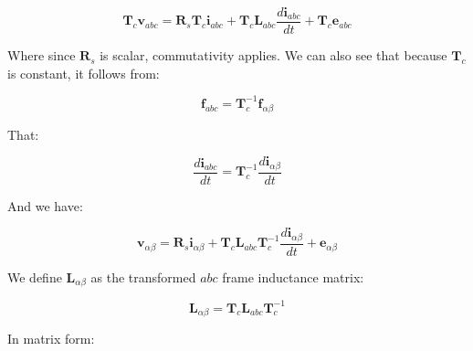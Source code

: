 \documentclass{article}
\begin{document}
\begin{equation}
    \mathbf{T}_c\mathbf{v}_{abc} = \mathbf{R}_s\mathbf{T}_c\mathbf{i}_{abc} + \mathbf{T}_c\mathbf{L}_{abc}\frac{d\mathbf{i}_{abc}}{dt} + \mathbf{T}_c\boldsymbol{e}_{abc}
\end{equation}

Where since $\mathbf{R}_s$ is scalar, commutativity applies. We can also see that because $\mathbf{T}_c$ is constant, it follows from:

\begin{equation}
    \mathbf{f}_{abc} = \mathbf{T}_c^{-1}\mathbf{f}_{\alpha\beta}
\end{equation}

That:

\begin{equation}
    \frac{d\mathbf{i}_{abc}}{dt} = \mathbf{T}_c^{-1}\frac{d\mathbf{i}_{\alpha\beta}}{dt}
\end{equation}

And we have:

\begin{equation}
    \mathbf{v}_{\alpha\beta} = \mathbf{R}_s\mathbf{i}_{\alpha\beta} + \mathbf{T}_c\mathbf{L}_{abc}\mathbf{T}_c^{-1}\frac{d\mathbf{i}_{\alpha\beta}}{dt} + \mathbf{e}_{\alpha\beta}
\end{equation}

We define $\mathbf{L}_{\alpha\beta}$ as the transformed $abc$ frame inductance matrix:

\begin{equation}
    \mathbf{L}_{\alpha\beta} = \mathbf{T}_c\mathbf{L}_{abc}\mathbf{T}_c^{-1}
\end{equation}

In matrix form:
\end{document}
